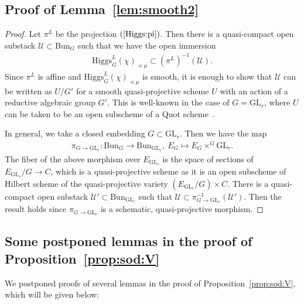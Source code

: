 \documentclass [11pt,oneside,a4paper,mathscr]{amsart}
\theoremstyle{definition}
\newcommand{\GL}{\operatorname{GL}}
\newcommand{\Hig}{\mathrm{Higgs}}
\newcommand{\Bun}{\mathrm{Bun}}
\begin{document}
\subsection{Proof of Lemma~\ref{lem:smooth2}}\label{subsec:lem:smooth2}
\begin{proof}
Let $\pi^L$ be the projection $(\ref{Higgs:pi})$. Then there is a quasi-compact 
open substack $\mathcal{U} \subset \Bun_G$ such that we have 
the open immersion
\begin{align*}\Hig_G^{L}(\chi)_{\preceq \mu} \subset (\pi^L)^{-1}(\mathcal{U}).
\end{align*}
Since $\pi^L$ is affine and $\Hig_G^{L}(\chi)_{\preceq \mu}$ is smooth, it is enough to show that $\mathcal{U}$ can be 
written as $U/G'$ for a smooth quasi-projective scheme $U$ with an action of 
a reductive algebraic group $G'$. 
This is well-known in the case of $G=\mathrm{GL}_r$, where $U$ can be taken to be an 
open subscheme of a Quot scheme~\cite{MR1450870}. 

In general, 
we take a closed embedding $G \subset \mathrm{GL}_r$. Then we have the map 
\begin{align*}\pi_{G \to \mathrm{GL}_r} \colon 
\Bun_{G} \to \Bun_{\mathrm{GL}_r}, \ E_{G} \mapsto E_G\times^G \mathrm{GL}_r. 
\end{align*}
The fiber of the above morphism over $E_{\GL_r}$ is the space of sections of
$E_{\GL_r}/G \to C$, which is a quasi-projective scheme as it is an open subscheme 
of Hilbert scheme of the quasi-projective variety $(E_{\GL_r}/G) \times C$.
There is a quasi-compact open substack $\mathcal{U}' \subset \Bun_{\mathrm{GL}_r}$ such that 
$\mathcal{U} \subset \pi_{G\to \mathrm{GL}_r}^{-1}(\mathcal{U}')$.
Then the result holds since $\pi_{G\to \mathrm{GL}_r}$ is a schematic, quasi-projective 
morphism. 
    \end{proof}

    \subsection{Some postponed lemmas in the proof of Proposition~\ref{prop:sod:V}}\label{subsec:postpone}
    We postponed proofs of several lemmas in the proof of Proposition~\ref{prop:sod:V}, which will be given below: 
\end{document}
